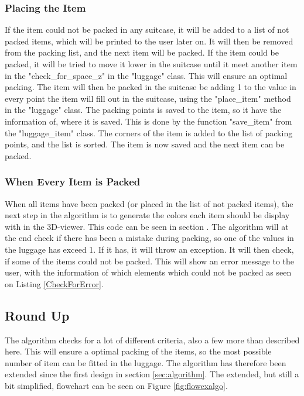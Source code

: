 \subsubsection{Placing the Item}
If the item could not be packed in any suitcase, it will be added to a list of not packed items, which will be printed to the user later on. It will then be removed from the packing list, and the next item will be packed. If the item could be packed, it will be tried to move it lower in the suitcase until it meet another item in the "check\_for\_space\_z" in the "luggage" class. This will ensure an optimal packing. The item will then be packed in the suitcase be adding 1 to the value in every point the item will fill out in the suitcase, using the "place\_item" method in the "luggage" class. The packing points is saved to the item, so it have the information of, where it is saved. This is done by the function "save\_item" from the "luggage\_item" class. The corners of the item is added to the list of packing points, and the list is sorted. The item is now saved and the next item can be packed.
\subsubsection{When Every Item is Packed}
When all items have been packed (or placed in the list of not packed items), the next step in the algorithm is to generate the colors each item should be display with in the 3D-viewer. This code can be seen in section .
The algorithm will at the end check if there has been a mistake during packing, so one of the values in the luggage has exceed 1. If it has, it will throw an exception. It will then check, if some of the items could not be packed. This will show an error message to the user, with the information of which elements which could not be packed as seen on Listing \ref{CheckForError}.

\subsection{Round Up}
The algorithm checks for a lot of different criteria, also a few more than described here. This will ensure a optimal packing of the items, so the most possible number of item can be fitted in the luggage. The algorithm has therefore been extended since the first design in section \ref{sec:algorithm}. The extended, but still a bit simplified, flowchart can be seen on Figure \ref{fig:flowexalgo}.

